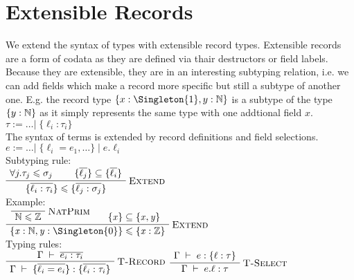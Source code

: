 \chapter{Extensible Records}
\label{ch:records}


We extend the syntax of types with extensible record types. \cite{leijen2005extensible}
Extensible records are a form of codata as they are defined via thair destructors or field labels.
Because they are extensible, they are in an interesting subtyping relation, i.e. we can add fields which make a record more specific but still a subtype of another one.
E.g. the record type $\{ x : \Singleton{1}, y : \Nat \}$ is a subtype of the type $\{ y : \mathbb{N} \}$ as it simply represents the same type with one addtional field $x$. \\
$ \tau := \dots | \; \{ \ell_i : \tau_i \} $ \\

The syntax of terms is extended by record definitions and field selections. \\
$ e := \dots | \; \{ \ell_i = e_1, \dots \} \; | \; e.\ell_i $ \\


Subtyping rule: \\
$
\AxiomC{$\forall j. \tau_j \sub \sigma_j$}
\AxiomC{$\{ \overline{\ell_j} \} \subseteq \{ \overline{\ell_i} \}$}
\RightLabel{\textsc{Extend}}
\BinaryInfC{$\{ \overline{\ell_i : \tau_i} \} \sub \{ \overline{\ell_j : \sigma_j} \}$}
\DisplayProof
$
\\

Example: \\
$
\AxiomC{}
\RightLabel{\textsc{NatPrim}}
\UnaryInfC{$\Nat \sub \Int$}
\AxiomC{$\{ \mathit{x} \} \subseteq \{ \mathit{x}, \mathit{y} \}$}
\RightLabel{\textsc{Extend}}
\BinaryInfC{$\{ \mathit{x} : \Nat, \mathit{y} : \Singleton{0} \} \sub \{ \mathit{x} : \Int \}$}
\DisplayProof
$
\\

Typing rules: \\
$
\AxiomC{$\ctx \overline{e_i : \tau_i}$}
\RightLabel{\textsc{T-Record}}
\UnaryInfC{$ \ctx \{ \overline{\ell_i = e_i} \} : \{ \overline{\ell_i : \tau_i} \}$}
\DisplayProof
$
$
\AxiomC{$ \ctx e : \{ \ell : \tau \}$}
\RightLabel{\textsc{T-Select}}
\UnaryInfC{$ \ctx e.\ell : \tau$}
\DisplayProof
$